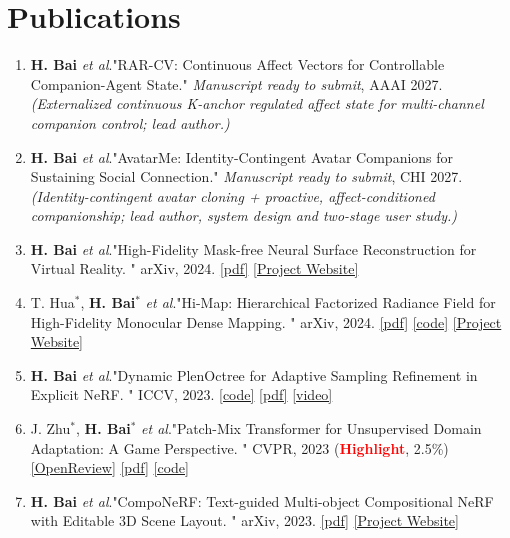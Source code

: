 \documentclass[letterpaper,10.8pt]{article}
\newcommand{\etal}{\textit{et al}.}
\begin{document}
\section{Publications}

\begin{enumerate}

\item \textbf{H. Bai} \etal "RAR-CV: Continuous Affect Vectors for Controllable Companion-Agent State." \textit{Manuscript ready to submit}, AAAI 2027. \textit{(Externalized continuous K-anchor regulated affect state for multi-channel companion control; lead author.)} \label{RAR-CV}
\item \textbf{H. Bai} \etal "AvatarMe: Identity-Contingent Avatar Companions for Sustaining Social Connection." \textit{Manuscript ready to submit}, CHI 2027. \textit{(Identity-contingent avatar cloning + proactive, affect-conditioned companionship; lead author, system design and two-stage user study.)} \label{AvatarMe}
\item \textbf{H. Bai} \etal "High-Fidelity Mask-free Neural Surface Reconstruction for Virtual Reality. " arXiv, 2024. \href{http://arxiv.org/abs/2409.13158}{[pdf]} \href{https://vlislab22.github.io/Hi-NeuS/}{[Project Website]}\label{Hi-NeuS}
\item T. Hua$^*$, \textbf{H. Bai$^*$} \etal "Hi-Map: Hierarchical Factorized Radiance Field for High-Fidelity Monocular Dense Mapping. " arXiv, 2024. \href{https://arxiv.org/abs/2401.03203}{[pdf]} \href{https://github.com/thua919/Hi-Map}{[code]} \href{https://vlis2022.github.io/fmap/}{[Project Website]} \label{HiMap}
\item \textbf{H. Bai} \etal "Dynamic PlenOctree for Adaptive Sampling Refinement in Explicit NeRF. " ICCV, 2023. \href{https://github.com/164140757/DOT}{[code]} \href{https://arxiv.org/abs/2307.15333}{[pdf]} \href{https://www.youtube.com/watch?v=i9MnoFhH8Ec}{[video]} \label{DOT}
\item J. Zhu$^*$, \textbf{H. Bai$^*$} \etal "Patch-Mix Transformer for Unsupervised Domain Adaptation: A Game Perspective. " CVPR, 2023 (\textbf{\textcolor{red}{Highlight}}, 2.5\%) \href{https://openreview.net/forum?id=T39lkzQ4iU}{[OpenReview]} \href{https://arxiv.org/abs/2303.13434}{[pdf]}
\href{https://github.com/JinjingZhu/PMTrans}{[code]}
\label{PMTrans}
\item \textbf{H. Bai} \etal "CompoNeRF: Text-guided Multi-object Compositional NeRF with Editable 3D Scene Layout. " arXiv, 2023. \href{https://arxiv.org/abs/2303.13843}{[pdf]} \href{https://vlislab22.github.io/componerf/}{[Project Website]}\label{CompoNeRF}

\end{enumerate}
\end{document}

